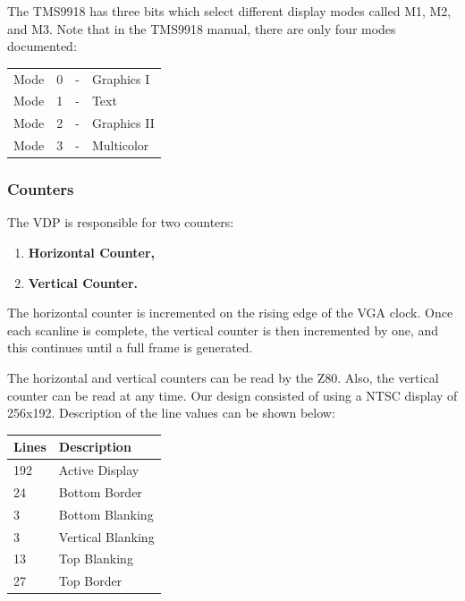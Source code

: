 \documentclass{article}
\begin{document}
The TMS9918 has three bits which select different display modes called M1, M2,
and M3. Note that in the TMS9918 manual, there are only four modes documented:

\begin{table}[H]
    \centering
    \begin{tabular}{l c c l}
        Mode & 0 & - & Graphics I   \\
        Mode & 1 & - & Text         \\
        Mode & 2 & - & Graphics II  \\
        Mode & 3 & - & Multicolor   \\
    \end{tabular}
\end{table}

\subsubsection{Counters}

The VDP is responsible for two counters:

\begin{enumerate}
    \item \textbf{Horizontal Counter,}
    \item \textbf{Vertical Counter.}
\end{enumerate}

The horizontal counter is incremented on the rising edge of the VGA clock. Once
each scanline is complete, the vertical counter is then incremented by one, and
this continues until a full frame is generated.

The horizontal and vertical counters can be read by the Z80. Also, the vertical
counter can be read at any time. Our design consisted of using a NTSC display of
256x192. Description of the line values can be shown below:

\begin{table}[H]
    \centering
    \begin{tabular}{l|l}
        Lines   & Description       \\ \hline \hline
        192     & Active Display    \\
        24      & Bottom Border     \\
        3       & Bottom Blanking   \\
        3       & Vertical Blanking \\
        13      & Top Blanking      \\
        27      & Top Border        \\
    \end{tabular}
\end{table}
\end{document}
